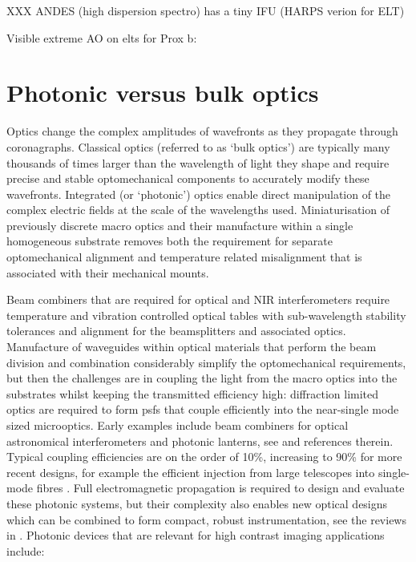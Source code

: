 \documentclass[letterpaper]{ar-1col}
\begin{document}
XXX ANDES (high dispersion spectro) has a tiny IFU (HARPS verion for ELT)



Visible extreme AO on \acp{elt} for Prox b: \citep{Fowler23}


\section{Photonic versus bulk optics}

Optics change the complex amplitudes of wavefronts as they propagate through coronagraphs.
%
Classical optics (referred to as `bulk optics') are typically many thousands of times larger than the wavelength of light they shape and require precise and stable optomechanical components to accurately modify these wavefronts.
%
Integrated (or `photonic') optics enable direct manipulation of the complex electric fields at the scale of the wavelengths used.
%
Miniaturisation of previously discrete macro optics and their manufacture within a single homogeneous substrate removes both the requirement for separate optomechanical alignment and temperature related misalignment that is associated with their mechanical mounts.
%

Beam combiners that are required for optical and NIR interferometers require temperature and vibration controlled optical tables with sub-wavelength stability tolerances and alignment for the beamsplitters and associated optics.
%
Manufacture of waveguides within optical materials that perform the beam division and combination considerably simplify the optomechanical requirements, but then the challenges are in coupling the light from the macro optics into the substrates whilst keeping the transmitted efficiency high: diffraction limited optics are required to form \acp{psf} that couple efficiently into the near-single mode sized microoptics.
%
Early examples include beam combiners for optical astronomical interferometers \citep[for example the IOTA/IONIC beam combiner; ][]{Berger01} and photonic lanterns, see \citet{Leon-Saval10} and references therein.
%
Typical coupling efficiencies are on the order of 10\%, increasing to 90\% for more recent designs, for example the efficient injection from large telescopes into single-mode fibres \citep{Jovanovic17}.
%
Full electromagnetic propagation is required to design and evaluate these photonic systems, but their complexity also enables new optical designs which can be combined to form compact, robust instrumentation, see the reviews in \citet{Minardi21,Jovanovic23}.
%
Photonic devices that are relevant for high contrast imaging applications include:
\end{document}
